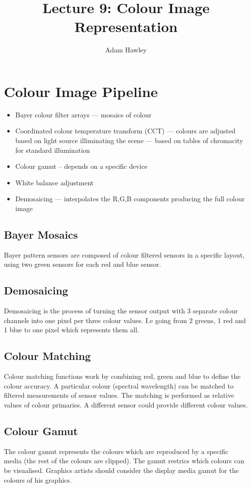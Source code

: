 \documentclass{article}
\title{Lecture 9: Colour Image Representation}
\author{Adam Hawley}
\begin{document}
\maketitle
\section{Colour Image Pipeline}
\begin{itemize}
	\item Bayer colour filter arrays --- mosaics of colour
	\item Coordinated colour temperature transform (CCT) --- colours are adjusted based on light source illiminating the scene --- based on tables of chromacity for standard illumination
	\item Colour gamut -- depends on a specific device
	\item White balance adjustment
	\item Demosaicing --- interpolates the R,G,B components producing the full colour image
\end{itemize}

\subsection{Bayer Mosaics}
Bayer pattern sensors are composed of colour filtered sensors in a specific layout, using two green sensors for each red and blue sensor.

\subsection{Demosaicing}
Demosaicing is the process of turning the sensor output with 3 separate colour channels into one pixel per three colour values.
I.e going from 2 greens, 1 red and 1 blue to one pixel which represents them all.

\subsection{Colour Matching}
Colour matching functions work by combining red, green and blue to define the colour accuracy.
A particular colour (spectral wavelength) can be matched to filtered measurements of sensor values.
The matching is performed as relative values of colour primaries.
A different sensor could provide different colour values.

\subsection{Colour Gamut}
The colour gamut represents the colours which are reproduced by a specific media (the rest of the colours are clipped).
The gamut restrics which colours can be visualised.
Graphics artists should consider the display media gamut for the colours of his graphics.
\end{document}
